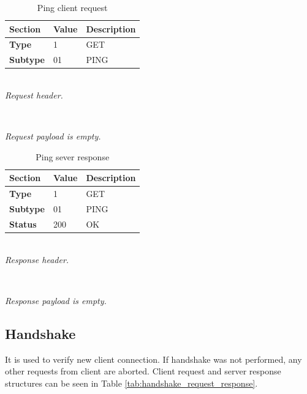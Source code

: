 \documentclass[english, sem, kiv, he, iso690alph, pdf, viewonly]{fasthesis}
\begin{document}
\begin{table}[h]
	\centering
	\begin{minipage}[b]{1.0\textwidth}
		\centering
		\begin{tabular}{|l|l|l|}
			\hline
			\textbf{Section} & \textbf{Value} & \textbf{Description} \\ \hline
			\textbf{Type} & 1 & GET \\ \hline
			\textbf{Subtype} & 01 & PING \\ \hline
		\end{tabular} \\
		\textit{Request header.}
	\end{minipage} \\
	\vspace{0.5cm}
	\begin{minipage}[b]{1.0\textwidth}
		\centering
		\textit{Request payload is empty.}
	\end{minipage}	
	\caption{Ping client request}
	\label{tab:ping_client_request}
\end{table}

\begin{table}[h]
	\centering
	\begin{minipage}[b]{1.0\textwidth}
		\centering
		\begin{tabular}{|l|l|l|}
			\hline
			\textbf{Section} & \textbf{Value} & \textbf{Description} \\ \hline
			\textbf{Type} & 1 & GET \\ \hline
			\textbf{Subtype} & 01 & PING \\ \hline
			\textbf{Status} & 200 & OK \\ \hline
		\end{tabular} \\
		\textit{Response header.}
	\end{minipage} \\
	\vspace{0.5cm}
	\begin{minipage}[b]{1.0\textwidth}
		\centering
		\textit{Response payload is empty.}
	\end{minipage}	
	\caption{Ping sever response}
	\label{tab:ping_server_response}
\end{table}

\newpage

\subsection{Handshake}
It is used to verify new client connection. If handshake was not performed, any other requests from client are aborted. Client request and server response structures can be seen in Table \ref{tab:handshake_request_response}.
\end{document}
